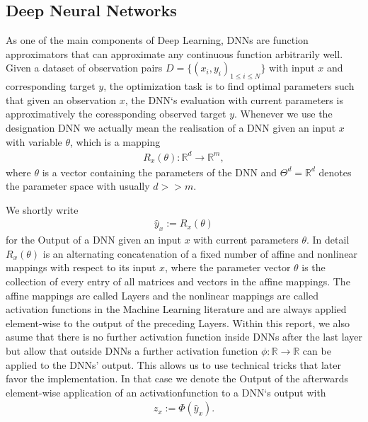 \documentclass[conference]{IEEEtran}
\begin{document}
\subsection{Deep Neural Networks}
As one of the main components of Deep Learning, DNNs are function approximators that can approximate any continuous function arbitrarily well. Given a dataset of observation pairs $D =\{(x_{i}, y_{i})_{1\leq i\leq N}\}$ with input ${x}$ and corresponding target $y$, the optimization task is to find optimal parameters such that given an observation $x$, the DNN`s evaluation with current parameters is approximatively the coressponding observed target $y$.  Whenever we use the designation
DNN we actually mean the realisation of a DNN given an input $x$ with variable $\theta$, which is a mapping
\begin{align}
R_{x}(\theta):\mathbb{R}^{d}\rightarrow\mathbb{R}^{m},
\end{align}
where $\theta$ is a vector containing the parameters of the DNN and $\Theta^{d}=\mathbb{R}^{d}$ denotes the parameter space with usually $d >> m$. 

We shortly write 
\begin{align} 
\hat{y}_{x} := R_{x}(\theta)
\end{align}
for the Output of a DNN given an input $x$ with current parameters $\theta$. 
In detail $R_{x}(\theta)$ is an alternating concatenation of a fixed number of affine and nonlinear mappings with respect to its input $x$, where the parameter vector $\theta$ is the collection of every entry of all matrices and vectors in the affine mappings. The affine mappings are called Layers and the nonlinear mappings are called activation functions in the Machine Learning literature and are always applied element-wise to the output of the preceding Layers. %
Within this report, we also asume that there is no further activation function inside DNNs after the last layer but allow that outside DNNs a further activation function $\phi:\mathbb{R}\rightarrow\mathbb{R}$ can be applied to the DNNs' output. This allows us to use technical tricks that later favor the implementation.
In that case we denote the Output of the afterwards element-wise application of an activationfunction to a DNN`s output with
\begin{align}
z_{x} := \Phi(\hat{y}_{x}).
\end{align}
\end{document}
